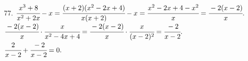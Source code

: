 77. $\cfrac{x^3+8}{x^2+2x}-x=\cfrac{(x+2)(x^2-2x+4)}{x(x+2)}-x=\cfrac{x^2-2x+4-x^2}{x}=\cfrac{-2(x-2)}{x}.$\\
$\cfrac{-2(x-2)}{x}\cdot\cfrac{x}{x^2-4x+4}=\cfrac{-2(x-2)}{x}\cdot\cfrac{x}{(x-2)^2}=\cfrac{-2}{x-2}.$\\
$\cfrac{2}{x-2}+\cfrac{-2}{x-2}=0.$\\
